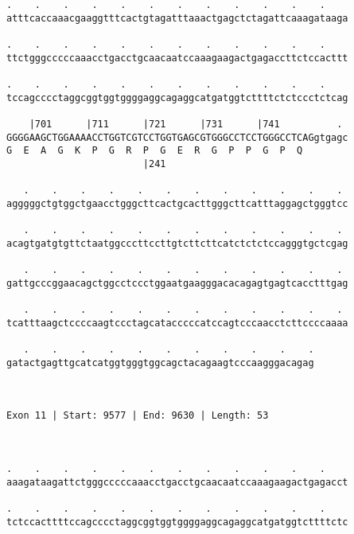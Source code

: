 \documentclass{article}
\begin{document}
\begin{Verbatim}
.    .    .    .    .    .    .    .    .    .    .    .    
atttcaccaaacgaaggtttcactgtagatttaaactgagctctagattcaaagataaga
                                                            
.    .    .    .    .    .    .    .    .    .    .    .    
ttctgggcccccaaacctgacctgcaacaatccaaagaagactgagaccttctccacttt
                                                            
.    .    .    .    .    .    .    .    .    .    .    .    
tccagcccctaggcggtggtggggaggcagaggcatgatggtcttttctctccctctcag
                                                            
    |701      |711      |721      |731      |741          . 
GGGGAAGCTGGAAAACCTGGTCGTCCTGGTGAGCGTGGGCCTCCTGGGCCTCAGgtgagc
G  E  A  G  K  P  G  R  P  G  E  R  G  P  P  G  P  Q        
                        |241                                
  
   .    .    .    .    .    .    .    .    .    .    .    . 
agggggctgtggctgaacctgggcttcactgcacttgggcttcatttaggagctgggtcc
                                                            
   .    .    .    .    .    .    .    .    .    .    .    . 
acagtgatgtgttctaatggcccttccttgtcttcttcatctctctccagggtgctcgag
                                                            
   .    .    .    .    .    .    .    .    .    .    .    . 
gattgcccggaacagctggcctccctggaatgaagggacacagagtgagtcacctttgag
                                                            
   .    .    .    .    .    .    .    .    .    .    .    . 
tcatttaagctccccaagtccctagcatacccccatccagtcccaacctcttccccaaaa
                                                            
   .    .    .    .    .    .    .    .    .    .    .
gatactgagttgcatcatggtgggtggcagctacagaagtcccaagggacagag
                                                      
                                                      
 
Exon 11 | Start: 9577 | End: 9630 | Length: 53



.    .    .    .    .    .    .    .    .    .    .    .    
aaagataagattctgggcccccaaacctgacctgcaacaatccaaagaagactgagacct
                                                            
.    .    .    .    .    .    .    .    .    .    .    .    
tctccacttttccagcccctaggcggtggtggggaggcagaggcatgatggtcttttctc
                                                            

\end{Verbatim}
\end{document}
